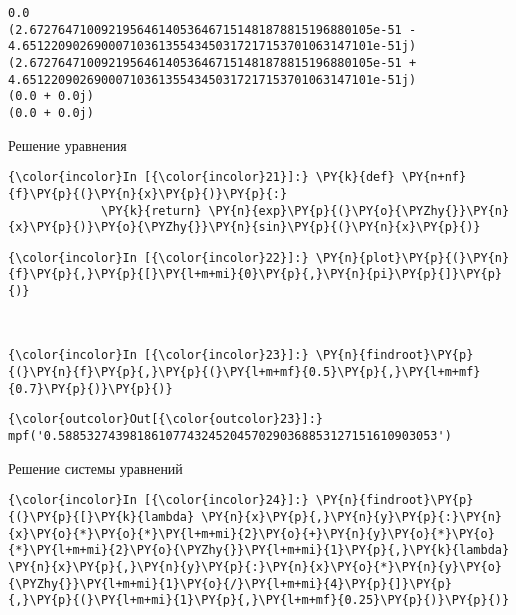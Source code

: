     \begin{Verbatim}[commandchars=\\\{\}]
0.0
(2.672764710092195646140536467151481878815196880105e-51 - 4.6512209026900071036135543450317217153701063147101e-51j)
(2.672764710092195646140536467151481878815196880105e-51 + 4.6512209026900071036135543450317217153701063147101e-51j)
(0.0 + 0.0j)
(0.0 + 0.0j)

    \end{Verbatim}

    Решение уравнения

    \begin{Verbatim}[commandchars=\\\{\}]
{\color{incolor}In [{\color{incolor}21}]:} \PY{k}{def} \PY{n+nf}{f}\PY{p}{(}\PY{n}{x}\PY{p}{)}\PY{p}{:}
             \PY{k}{return} \PY{n}{exp}\PY{p}{(}\PY{o}{\PYZhy{}}\PY{n}{x}\PY{p}{)}\PY{o}{\PYZhy{}}\PY{n}{sin}\PY{p}{(}\PY{n}{x}\PY{p}{)}
\end{Verbatim}

    \begin{Verbatim}[commandchars=\\\{\}]
{\color{incolor}In [{\color{incolor}22}]:} \PY{n}{plot}\PY{p}{(}\PY{n}{f}\PY{p}{,}\PY{p}{[}\PY{l+m+mi}{0}\PY{p}{,}\PY{n}{pi}\PY{p}{]}\PY{p}{)}
\end{Verbatim}

    \begin{center}
    \end{center}
    { \hspace*{\fill} \\}
    
    \begin{Verbatim}[commandchars=\\\{\}]
{\color{incolor}In [{\color{incolor}23}]:} \PY{n}{findroot}\PY{p}{(}\PY{n}{f}\PY{p}{,}\PY{p}{(}\PY{l+m+mf}{0.5}\PY{p}{,}\PY{l+m+mf}{0.7}\PY{p}{)}\PY{p}{)}
\end{Verbatim}

            \begin{Verbatim}[commandchars=\\\{\}]
{\color{outcolor}Out[{\color{outcolor}23}]:} mpf('0.58853274398186107743245204570290368853127151610903053')
\end{Verbatim}
        
    Решение системы уравнений

    \begin{Verbatim}[commandchars=\\\{\}]
{\color{incolor}In [{\color{incolor}24}]:} \PY{n}{findroot}\PY{p}{(}\PY{p}{[}\PY{k}{lambda} \PY{n}{x}\PY{p}{,}\PY{n}{y}\PY{p}{:}\PY{n}{x}\PY{o}{*}\PY{o}{*}\PY{l+m+mi}{2}\PY{o}{+}\PY{n}{y}\PY{o}{*}\PY{o}{*}\PY{l+m+mi}{2}\PY{o}{\PYZhy{}}\PY{l+m+mi}{1}\PY{p}{,}\PY{k}{lambda} \PY{n}{x}\PY{p}{,}\PY{n}{y}\PY{p}{:}\PY{n}{x}\PY{o}{*}\PY{n}{y}\PY{o}{\PYZhy{}}\PY{l+m+mi}{1}\PY{o}{/}\PY{l+m+mi}{4}\PY{p}{]}\PY{p}{,}\PY{p}{(}\PY{l+m+mi}{1}\PY{p}{,}\PY{l+m+mf}{0.25}\PY{p}{)}\PY{p}{)}
\end{Verbatim}

